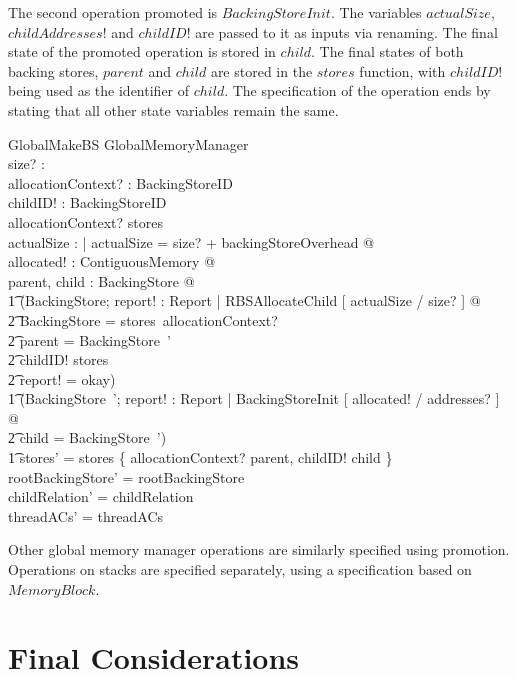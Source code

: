 \documentclass[a4paper,10pt]{report}
\begin{document}
The second operation promoted is $BackingStoreInit$.
The variables $actualSize$, $childAddresses!$ and $childID!$ are
passed to it as inputs via renaming.
The final state of the promoted operation is stored in $child$.
The final states of both backing stores, $parent$ and $child$ are
stored in the $stores$ function, with $childID!$ being used as the
identifier of $child$.
The specification of the operation ends by stating that all other
state variables remain the same.
%
\begin{schema}{GlobalMakeBS}
  \Delta GlobalMemoryManager \\
  size?
  : \nat \\
  allocationContext?
  : BackingStoreID \\
  childID!
  : BackingStoreID \\
  \where allocationContext?
  \in \dom stores \\
  \exists actualSize : \nat | actualSize = size?
  + backingStoreOverhead @ \\
  \exists allocated!
  : ContiguousMemory @ \\
  \exists parent, child : BackingStore @ \\
  \t1 (\exists \Delta BackingStore; report!
  : Report | RBSAllocateChild [ actualSize / size?
  ] @ \\
  \t2 \theta BackingStore = stores~allocationContext?
  \land \\
  \t2 parent = \theta BackingStore~' \land \\
  \t2 childID!
  \notin \dom stores \land \\
  \t2 report!
  = okay) \land \\
  \t1 (\exists BackingStore~'; report!
  : Report | BackingStoreInit [ allocated!
  / addresses?
  ] @ \\
  \t2 child = \theta BackingStore~') \land \\
  \t1 stores' = stores \oplus \{ allocationContext?
  \mapsto parent, childID!
  \mapsto child \} \\
  rootBackingStore' = rootBackingStore \\
  childRelation' = childRelation \\
  threadACs' = threadACs \\
\end{schema}
%
Other global memory manager operations are similarly specified using
promotion.
Operations on stacks are specified separately, using a specification
based on $MemoryBlock$.

\section{Final Considerations}
\end{document}
